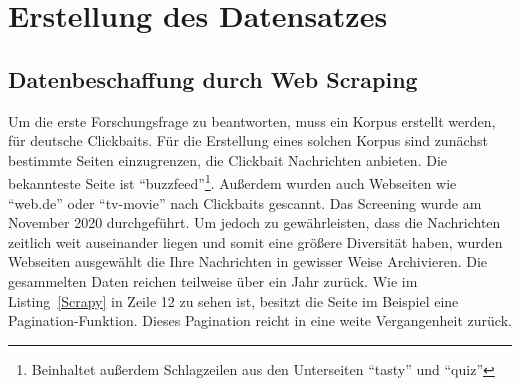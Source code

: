 \chapter{Erstellung des Datensatzes} \label{ch 6}
\section{Datenbeschaffung durch Web Scraping}

Um die erste Forschungsfrage zu beantworten, muss ein Korpus erstellt werden, für deutsche Clickbaits. Für die Erstellung eines solchen Korpus sind zunächst bestimmte Seiten einzugrenzen, die Clickbait Nachrichten anbieten. Die bekannteste Seite ist \enquote{buzzfeed}\footnote{Beinhaltet außerdem Schlagzeilen aus den Unterseiten \enquote{tasty} und \enquote{quiz}}. Außerdem wurden auch Webseiten wie \enquote{web.de} oder \enquote{tv-movie} nach Clickbaits gescannt. Das Screening wurde am November 2020 durchgeführt. Um jedoch zu gewährleisten, dass die Nachrichten zeitlich weit auseinander liegen und somit eine größere Diversität haben, wurden Webseiten ausgewählt die Ihre Nachrichten in gewisser Weise Archivieren. Die gesammelten Daten reichen teilweise über ein Jahr zurück. Wie im Listing~\ref{Scrapy} in Zeile 12 zu sehen ist, besitzt die Seite im Beispiel eine Pagination-Funktion. Dieses Pagination reicht in eine weite Vergangenheit zurück.

